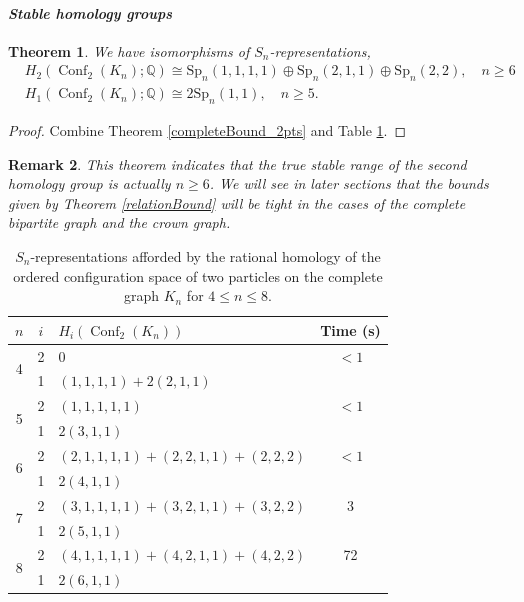 \documentclass[12pt]{amsart}
\newtheorem{thm}{Theorem}[section]
\newtheorem{remark}[thm]{Remark}
\theoremstyle{definition}
\newcommand{\Q}{\mathbb{Q}}
\newcommand{\conf}{\operatorname{Conf}}
\begin{document}
\paragraph{\textit{Stable homology groups}}
\begin{thm}\label{thm: ordered complete}
    We have isomorphisms of $S_n$-representations,
    \begin{align*}
        &H_2(\conf_2(K_n);\Q)\cong\mathrm{Sp}_n(1,1,1,1) \oplus \mathrm{Sp}_n(2,1,1) \oplus \mathrm{Sp}_n(2,2),\quad n\geq 6\\
        &H_1(\conf_2(K_n);\Q)\cong2\mathrm{Sp}_n(1,1),\quad n\geq 5.
    \end{align*}
\end{thm}

\begin{proof}
Combine Theorem \ref{completeBound_2pts} and Table \ref{table: ordered 2 pts Kn}.
\end{proof}

\begin{remark}
    This theorem indicates that the true stable range of the second homology group is actually $n \geq 6$. We will see in later sections that the bounds given by Theorem \ref{relationBound} will be tight in the cases of the complete bipartite graph and the crown graph.
\end{remark}


\begin{table}[th]
\caption{$S_n$-representations afforded by the rational homology of the ordered configuration space of two particles on the complete graph $K_n$ for $4\leq n \leq 8$.}
\label{table: ordered 2 pts Kn}
\begin{tabular}{@{}cclc@{}} \toprule
$n$ & $i$ & $H_i(\conf_2(K_n))$ & Time (s) \\
\midrule
\multirow[t]{2}{*}{4} & 2 & 0 & $<1$ \\[2pt]
& 1 & $(1,1,1,1) + 2(2,1,1)$ & \\ \midrule
\multirow[t]{2}{*}{5} & 2   & $(1,1,1,1,1)$ & $<1$ \\[2pt]
& 1   & $2(3,1,1)$ & \\\midrule
\multirow[t]{2}{*}{6} & 2 & $(2, 1, 1, 1, 1) + (2, 2, 1, 1) + (2, 2, 2)$ & $<1$ \\[2pt]
& 1 & $2(4,1,1)$ & \\\midrule
\multirow[t]{2}{*}{7} & 2 & $(3, 1, 1, 1, 1) + (3, 2, 1, 1) + (3, 2, 2)$ & 3 \\[2pt]
& 1 & $2(5,1,1)$ & \\\midrule
\multirow[t]{2}{*}{8} & 2 & $(4, 1, 1, 1, 1) + (4, 2, 1, 1) + (4, 2, 2)$ & 72 \\[2pt]
& 1 & $2(6,1,1)$ & \\
\bottomrule
\end{tabular}

\end{table}
\end{document}
